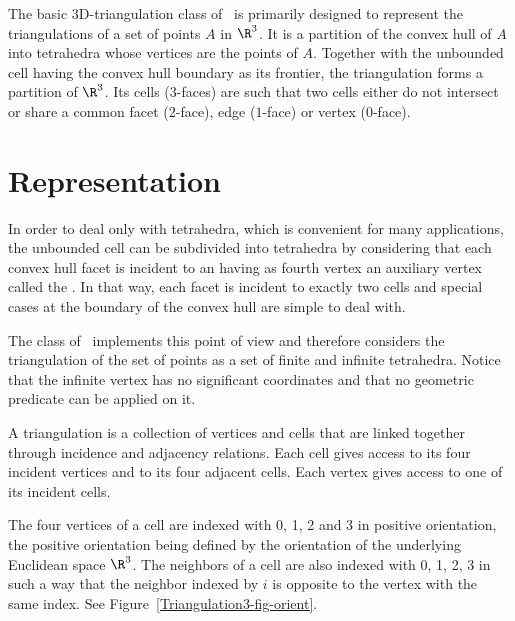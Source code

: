 The basic 3D-triangulation class of \cgal\ is primarily designed to
represent the triangulations of a set of points $A$ in $\R^3$.  It is
a partition of the convex hull of {$A$} into tetrahedra whose vertices
are the points of {$A$}.  Together with the unbounded cell having the
convex hull boundary as its frontier, the triangulation forms a
partition of $\R^3$. Its cells ($3$-faces) are such that two cells
either do not intersect or share a common facet ($2$-face), edge
($1$-face) or vertex ($0$-face).

\section{Representation}
\label{Triangulation3-sec-intro}

In order to deal
only with tetrahedra, which is convenient for many applications, the
unbounded cell can be subdivided into tetrahedra by considering that
each convex hull facet is incident to an  having as
fourth vertex an auxiliary vertex called the .  In
that way, each facet is incident to exactly two cells and special cases
at the boundary of the convex hull are simple to deal with.

The class  of \cgal\ implements this
point of view and therefore considers the triangulation of the set
of points as a set of finite and infinite tetrahedra.  Notice that the
infinite vertex has no significant coordinates and that no
geometric predicate can be applied on it.

A triangulation is a collection of vertices and cells that are linked
together through incidence and adjacency relations. Each cell gives
access to its four incident vertices and to its four adjacent
cells. Each vertex gives access to one of its incident cells.

The four vertices of a cell are indexed with 0, 1, 2 and 3 in positive
orientation, the positive orientation being defined by the orientation
of the underlying Euclidean space $\R^3$. The neighbors of a cell are also
indexed with 0, 1, 2, 3 in such a way that the neighbor indexed by $i$
is opposite to the vertex with the same index. See
Figure~\ref{Triangulation3-fig-orient}.

